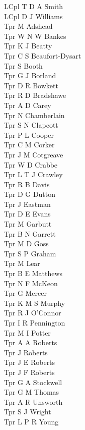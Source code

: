 \begin{multicols}{2}
  LCpl T D A Smith \\
  LCpl D J Williams \\
  Tpr M Adshead \\
  Tpr W N W Bankes \\
  Tpr K J Beatty \\
  Tpr C S Beaufort-Dysart \\
  Tpr S Booth \\
  Tpr G J Borland \\
  Tpr D R Bowkett \\
  Tpr R D Bradshawe \\
  Tpr A D Carey \\
  Tpr N Chamberlain \\
  Tpr S N Clapcott \\
  Tpr P L Cooper \\
  Tpr C M Corker \\
  Tpr J M Cotgreave \\
  Tpr W D Crabbe \\
  Tpr L T J Crawley \\
  Tpr R B Davis \\
  Tpr D G Dutton \\
  Tpr J Eastman \\
  Tpr D E Evans \\
  Tpr M Garbutt \\
  Tpr B N Garrett \\
  Tpr M D Goss \\
  Tpr S P Graham \\
  Tpr M Lear \\
  Tpr B E Matthews \\
  Tpr N F McKeon \\
  Tpr G Mercer \\
  Tpr K M S Murphy \\
  Tpr R J O'Connor \\
  Tpr I R Pennington \\
  Tpr M I Potter \\
  Tpr A A Roberts \\
  Tpr J Roberts \\
  Tpr J E Roberts \\
  Tpr J F Roberts \\
  Tpr G A Stockwell \\
  Tpr G M Thomas \\
  Tpr A R Unsworth \\
  Tpr S J Wright \\
  Tpr L P R Young \\

\end{multicols}
